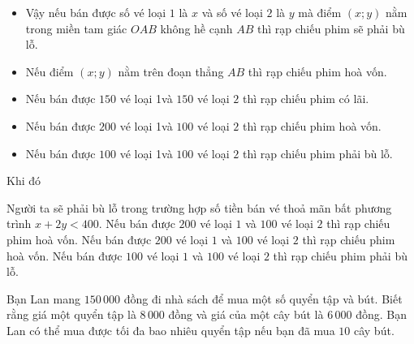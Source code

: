 \begin{ex}
{\begin{center}
		\end{center}
		\begin{itemize}
			\item Vậy nếu bán được số vé loại $1$ là $x$ và số vé loại $2$ là $y$ mà điểm $(x; y)$ nằm trong miền tam giác $OAB$ không hề cạnh $AB$ thì rạp chiếu phim sẽ phải bù  lỗ.
			 \item Nếu điểm $(x; y)$ nằm trên đoạn thẳng $AB$ thì rạp chiếu phim hoà vốn.
			\item Nếu bán được $150$ vé loại  1và $150$ vé loại $2$ thì rạp chiếu phim có lãi.
			\item Nếu bán được $200$ vé loại 1và $100$ vé loại  $2$ thì rạp chiếu phim hoà vốn.
			 \item Nếu bán được $100$ vé loại 1và $100$ vé loại $2$ thì rạp chiếu phim phải bù lỗ.
		\end{itemize}
		 Khi đó
		\begin{itemchoice}
			\itemch Người ta sẽ phải bù lỗ trong trường hợp số tiền bán vé thoả mãn bất phương trình $x+2y < 400$. 
			 \itemch Nếu bán được $200$ vé loại $1$ và $100$ vé loại $2$ thì rạp chiếu phim hoà vốn.
			\itemch Nếu bán được $200$ vé loại $1$ và  $100$ vé loại $2$ thì rạp chiếu phim hoà vốn.
			\itemch Nếu bán được $100$ vé  loại $1$ và $100$ vé loại $2$ thì rạp chiếu phim phải bù lỗ.
		\end{itemchoice}
	} 
\end{ex}


\begin{bt}%
	Bạn Lan mang $150\,000$ đồng đi nhà sách để mua một số quyển tập và bút. Biết rằng giá một quyển tập là $8\,000$ đồng và giá của một cây bút là $6\,000$ đồng. Bạn Lan có thể mua được tối đa bao nhiêu quyển tập  nếu bạn đã mua $10$ cây bút.
\end{bt}

